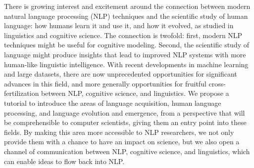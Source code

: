 There is growing interest and excitement around the connection between modern natural language processing (NLP) techniques and the scientific study of human language: how humans learn it and use it, and how it evolved, as studied in linguistics and cognitive science. The connection is twofold: first, modern NLP techniques might be useful for cognitive modeling. Second, the scientific study of language might produce insights that lead to improved NLP systems with more human-like linguistic intelligence. With recent developments in machine learning and large datasets, there are now unprecedented opportunities for significant advances in this field, and more generally opportunities for fruitful cross-fertilization between NLP, cognitive science, and linguistics. We propose a tutorial to introduce the areas of language acquisition, human language processing, and language evolution and emergence, from a perspective that will be comprehensible to computer scientists, giving them an entry point into these fields. By making this area more accessible to NLP researchers, we not only provide them with a chance to have an impact on science, but we also open a channel of communication between NLP, cognitive science, and linguistics, which can enable ideas to flow back into NLP.
